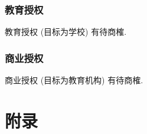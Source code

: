 \documentclass{ctexart}
\begin{document}
\subsubsection{教育授权}
教育授权 (目标为学校) 有待商榷.

\subsubsection{商业授权}
商业授权 (目标为教育机构) 有待商榷.



\section{附录}\label{S:appendix}
\end{document}
